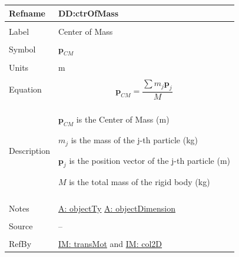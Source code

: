 \documentclass[12pt]{article}
\begin{document}
\noindent \begin{minipage}{\textwidth}
\begin{tabular}{>{\raggedright}p{}>{\raggedright\arraybackslash}p{}}
\toprule \textbf{Refname} & \textbf{DD:ctrOfMass}
\label{DD:ctrOfMass}
\\ \midrule \\
Label & Center of Mass
\\ \midrule \\
Symbol & ${\mathbf{p}_{CM}}$
\\ \midrule \\
Units & m
\\ \midrule \\
Equation & \begin{displaymath}
           {\mathbf{p}_{CM}}=\frac{\displaystyle\sum{{m_{j}} {\mathbf{p}_{j}}}}{M}
           \end{displaymath}
\\ \midrule \\
Description & \begin{symbDescription}
              \item{${\mathbf{p}_{CM}}$ is the Center of Mass (m)}
              \item{${m_{j}}$ is the mass of the j-th particle (kg)}
              \item{${\mathbf{p}_{j}}$ is the position vector of the j-th particle (m)}
              \item{$M$ is the total mass of the rigid body (kg)}
              \end{symbDescription}
\\ \midrule \\
Notes & \hyperref[assumpOT]{A: objectTy}
        \hyperref[assumpOD]{A: objectDimension}
\\ \midrule \\
Source & --
\\ \midrule \\
RefBy & \hyperref[IM:transMot]{IM: transMot} and \hyperref[IM:col2D]{IM: col2D}
\\ \bottomrule
\end{tabular}
\end{minipage}
\par~
\end{document}
